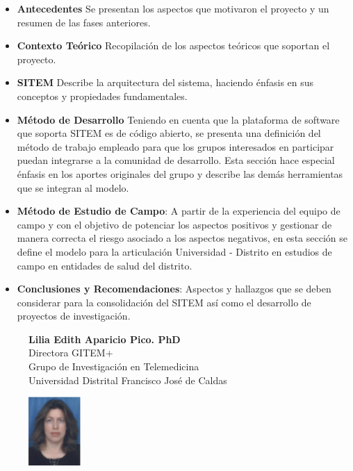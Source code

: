 \begin{itemize}
 \item \textbf{Antecedentes} Se presentan los aspectos que motivaron el proyecto y un resumen de las fases anteriores.
 \item \textbf{Contexto Teórico} Recopilación de los aspectos teóricos que soportan el proyecto. 
 \item \textbf{SITEM} Describe la arquitectura del sistema, haciendo énfasis en sus conceptos y propiedades fundamentales.
 \item \textbf{Método de Desarrollo} Teniendo en cuenta que la plataforma de software que soporta SITEM es de código abierto, se presenta una definición del método de trabajo empleado para que los grupos interesados en participar puedan integrarse a la comunidad de desarrollo. Esta sección hace especial énfasis en los aportes originales del grupo y describe las demás herramientas que se integran al modelo.
 \item \textbf{Método de Estudio de Campo}: A partir de la experiencia del equipo de campo y con el objetivo de potenciar los aspectos positivos y gestionar de manera correcta el riesgo asociado a los aspectos negativos, en esta sección se define el modelo para la articulación Universidad - Distrito en estudios de campo en entidades de salud del distrito.
 \item \textbf{Conclusiones y Recomendaciones}: Aspectos y hallazgos que se deben considerar para la consolidación del SITEM así como el desarrollo de proyectos de investigación.
\end{itemize}

\begin{figure}[!htpb]
\begin{minipage}[r]{0.8\textwidth}
\begin{flushright}
\textbf{Lilia Edith Aparicio Pico. PhD}
\\Directora GITEM+\\Grupo de Investigación en Telemedicina\\Universidad Distrital Francisco José de Caldas
\end{flushright}
\end{minipage}
\begin{minipage}[r]{0.15\textwidth}
 \includegraphics[width=20mm, height=26mm]{edith.png}
\end{minipage}
\end{figure}